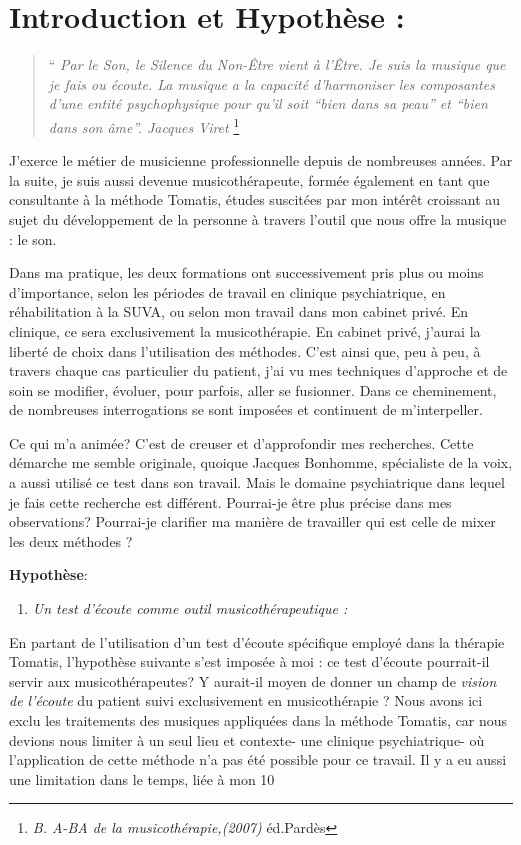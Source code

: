 \chapter{Introduction et Hypothèse : }
\begin{quotation}
``\emph{ Par le Son, le Silence du Non-Être vient à l'Être. Je suis
la musique que je fais ou écoute. La musique a la capacité d'harmoniser
les composantes d'une entité psychophysique pour qu'il soit ``bien
dans sa peau'' et ``bien dans son âme''. Jacques Viret }\footnote{\emph{B. A-BA de la musicothérapie,(2007)} éd.Pardès}
\end{quotation}
J'exerce le métier de musicienne professionnelle depuis de nombreuses
années. Par la suite, je suis aussi devenue musicothérapeute, formée
également en tant que consultante à la méthode Tomatis, études suscitées
par mon intérêt croissant au sujet du développement de la personne
à travers l'outil que nous offre la musique : le son.

Dans ma pratique, les deux formations ont successivement pris plus
ou moins d'importance, selon les périodes de travail en clinique psychiatrique,
en réhabilitation à la SUVA, ou selon mon travail dans mon cabinet
privé. En clinique, ce sera exclusivement la musicothérapie. En cabinet
privé, j'aurai la liberté de choix dans l'utilisation des méthodes.
C'est ainsi que, peu à peu, à travers chaque cas particulier du patient,
j'ai vu mes techniques d'approche et de soin se modifier, évoluer,
pour parfois, aller se fusionner. Dans ce cheminement, de nombreuses
interrogations se sont imposées et continuent de m'interpeller.

Ce qui m'a animée? C'est de creuser et d'approfondir mes recherches.
Cette démarche me semble originale, quoique Jacques Bonhomme, spécialiste de la voix, a aussi utilisé ce test dans son travail. Mais le domaine psychiatrique dans lequel je fais cette  recherche est différent.
 Pourrai-je être plus précise dans mes
observations? Pourrai-je clarifier ma manière de travailler qui est celle de mixer les deux méthodes ?

\textbf{Hypothèse}:\\ 
\begin{enumerate}
	\item \textit{Un test d'écoute comme outil musicothérapeutique :}
\end{enumerate}

En partant de l'utilisation d'un test d'écoute spécifique employé
dans la thérapie  Tomatis, l'hypothèse suivante s'est imposée à moi : ce test d'écoute
pourrait-il servir aux musicothérapeutes? Y aurait-il moyen de donner
un champ de \emph{vision de l'écoute }du patient suivi exclusivement
en musicothérapie ? Nous avons ici exclu les traitements des musiques appliquées dans la méthode Tomatis, car nous devions nous limiter à un seul lieu et contexte- une clinique psychiatrique- où l'application de cette méthode n'a pas été possible pour ce travail.  Il y a eu aussi une limitation dans le temps, liée à mon 10%

